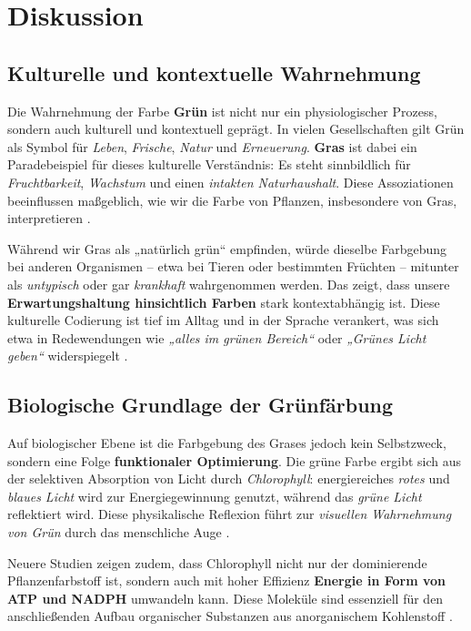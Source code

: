 \chapter{Diskussion}

\section{Kulturelle und kontextuelle Wahrnehmung}
Die Wahrnehmung der Farbe \textbf{Grün} ist nicht nur ein physiologischer Prozess, sondern auch kulturell und kontextuell geprägt. In vielen Gesellschaften gilt Grün als Symbol für \emph{Leben}, \emph{Frische}, \emph{Natur} und \emph{Erneuerung}. \textbf{Gras} ist dabei ein Paradebeispiel für dieses kulturelle Verständnis: Es steht sinnbildlich für \emph{Fruchtbarkeit}, \emph{Wachstum} und einen \emph{intakten Naturhaushalt}. Diese Assoziationen beeinflussen maßgeblich, wie wir die Farbe von Pflanzen, insbesondere von Gras, interpretieren \parencite{weber2016farbpsychologie}.

Während wir Gras als „natürlich grün“ empfinden, würde dieselbe Farbgebung bei anderen Organismen – etwa bei Tieren oder bestimmten Früchten – mitunter als \emph{untypisch} oder gar \emph{krankhaft} wahrgenommen werden. Das zeigt, dass unsere \textbf{Erwartungshaltung hinsichtlich Farben} stark kontextabhängig ist. Diese kulturelle Codierung ist tief im Alltag und in der Sprache verankert, was sich etwa in Redewendungen wie \emph{„alles im grünen Bereich“} oder \emph{„Grünes Licht geben“} widerspiegelt \parencite{fischer2010farbe}.

\section{Biologische Grundlage der Grünfärbung}
Auf biologischer Ebene ist die Farbgebung des Grases jedoch kein Selbstzweck, sondern eine Folge \textbf{funktionaler Optimierung}. Die grüne Farbe ergibt sich aus der selektiven Absorption von Licht durch \textit{Chlorophyll}: energiereiches \textit{rotes} und \textit{blaues Licht} wird zur Energiegewinnung genutzt, während das \textit{grüne Licht} reflektiert wird. Diese physikalische Reflexion führt zur \emph{visuellen Wahrnehmung von Grün} durch das menschliche Auge \parencite{meyer2018photosynthese}.

Neuere Studien zeigen zudem, dass Chlorophyll nicht nur der dominierende Pflanzenfarbstoff ist, sondern auch mit hoher Effizienz \textbf{Energie in Form von ATP und NADPH} umwandeln kann. Diese Moleküle sind essenziell für den anschließenden Aufbau organischer Substanzen aus anorganischem Kohlenstoff \parencite{zhao2012chlorophyll}.

